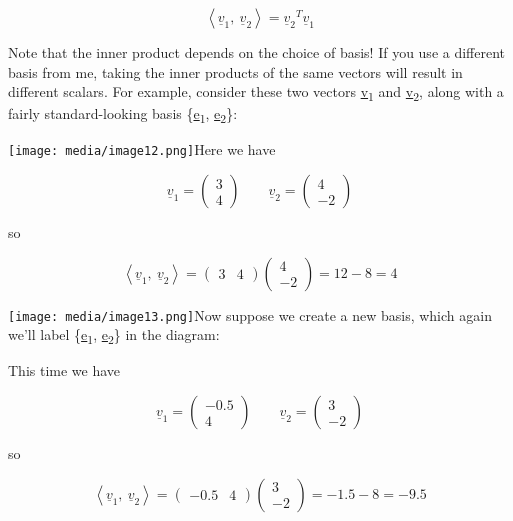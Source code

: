 \documentclass[oneside,english]{amsbook}
\numberwithin{section}{chapter}
\theoremstyle{plain}
\theoremstyle{definition}
\begin{document}
\[\left\langle {\underline{v}}_{1},\ {\underline{v}}_{2} \right\rangle = {{\underline{v}}_{2}}^{T}{\underline{v}}_{1}\]

Note that the inner product depends on the choice of basis! If you use a
different basis from me, taking the inner products of the same vectors
will result in different scalars. For example, consider these two
vectors \ul{v}\textsubscript{1} and \ul{v}\textsubscript{2}, along with
a fairly standard-looking basis \{\ul{e}\textsubscript{1},
\ul{e}\textsubscript{2}\}:

\texttt{[image: media/image12.png]}Here
we have

\[{\underline{v}}_{1} = \begin{pmatrix}
	3 \\
	4
\end{pmatrix}\ \ \ \ \ \ \ \ \ {\underline{v}}_{2} = \begin{pmatrix}
	4 \\
	- 2
\end{pmatrix}\]

so

\[\left\langle {\underline{v}}_{1},\ {\underline{v}}_{2} \right\rangle = \begin{pmatrix}
	3 & 4
\end{pmatrix}\begin{pmatrix}
	4 \\
	- 2
\end{pmatrix} = 12 - 8 = 4\]

\texttt{[image: media/image13.png]}Now
suppose we create a new basis, which again we'll label
\{\ul{e}\textsubscript{1}, \ul{e}\textsubscript{2}\} in the diagram:

This time we have

\[{\underline{v}}_{1} = \begin{pmatrix}
	- 0.5 \\
	4
\end{pmatrix}\ \ \ \ \ \ \ \ \ {\underline{v}}_{2} = \begin{pmatrix}
	3 \\
	- 2
\end{pmatrix}\]

so

\[\left\langle {\underline{v}}_{1},\ {\underline{v}}_{2} \right\rangle = \begin{pmatrix}
	- 0.5 & 4
\end{pmatrix}\begin{pmatrix}
	3 \\
	- 2
\end{pmatrix} = - 1.5 - 8 = - 9.5\]
\end{document}
